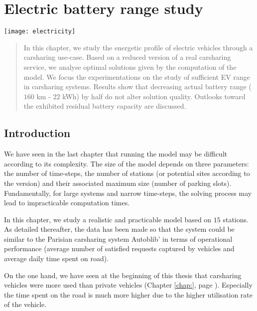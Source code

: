 \chapter{Electric battery range study} \label{chap:slpEnergyExp}
\begin{bibunit}[ieeetr]
\minitoc
\vspace{2cm}

\begin{minipage}[c]{.3\linewidth}
\texttt{[image: electricity]}
\end{minipage}
\hfill
\begin{minipage}[c]{.7\linewidth}
\begin{abstract}
In this chapter, we study the energetic profile of electric vehicles through a carsharing use-case.
Based on a reduced version of a real carsharing service, we analyse optimal solutions given by the computation of the {\ENERGY} model.
We focus the experimentations on the study of sufficient EV range in carsharing systems.
Results show that decreasing actual battery range ($160$ km - $22$ kWh) by half do not alter solution quality.
Outlooks toward the exhibited residual battery capacity are discussed.
\end{abstract}
\end{minipage}

\newpage
\section{Introduction}
We have seen in the last chapter that running the {\ENERGY} model may be difficult according to its complexity.
The size of the model depends on three parameters: the number of time-steps, the number of stations (or potential sites according to the version) and their associated maximum size (number of parking slots).
Fundamentally, for large systems and narrow time-steps, the solving process may lead to impracticable computation times.

\medskip
In this chapter, we study a realistic and practicable model based on $15$ stations.
As detailed thereafter, the data has been made so that the system could be similar to the Parisian carsharing system Autoblib' in terms of operational performance (average number of satisfied requests captured by vehicles and average daily time spent on road).

On the one hand, we have seen at the beginning of this thesis that carsharing vehicles were more used than private vehicles (\see Chapter \ref{chap:}, page \pageref{chap:}).
Especially the time spent on the road is much more higher due to the higher utilisation rate of the vehicle.


\end{bibunit}
